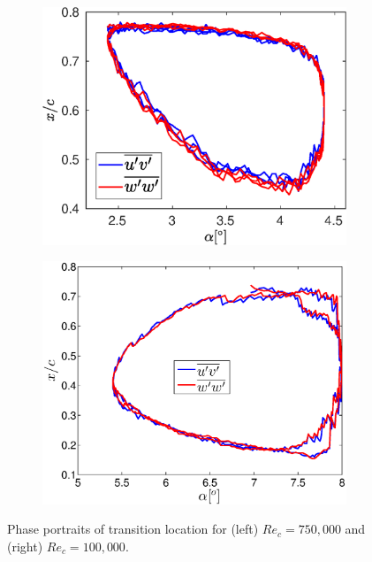 \begin{figure}[t]
	\begin{subfigure}[b]{0.49\textwidth}
		\centering		
		\includegraphics[width=1\textwidth,height=0.80\textwidth]{imgs/750k_transition_alpha.eps}
	\end{subfigure}
	\begin{subfigure}[b]{0.49\textwidth}
		\centering	
		\includegraphics[width=1\textwidth]{paper3/imgs/transition_alpha.eps}
	\end{subfigure}
	\caption{Phase portraits of transition location for (left) $Re_{c}=750,000$ and (right) $Re_{c}=100,000$.}
	\label{fig:overview_transition_alpha}
\end{figure}


